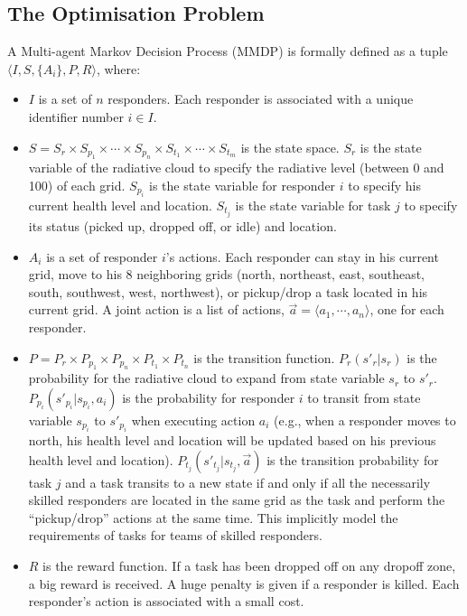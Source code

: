 \subsection{The Optimisation Problem}
A Multi-agent Markov Decision Process (MMDP) is formally defined as
a tuple $\langle I, S, \{A_i\}, P, R \rangle$, where:
\begin{itemize}
  \item $I$ is a set of $n$ responders. Each responder is
      associated with a unique identifier number $i\in I$.
  \item $S = S_r \times S_{p_1} \times \cdots \times S_{p_n}
      \times S_{t_1} \times \cdots \times S_{t_m}$ is the state
      space. $S_r$ is the state variable of the radiative cloud
      to specify the radiative level (between 0 and 100) of
      each grid. $S_{p_i}$ is the state variable for responder
      $i$ to specify his current health level and location.
      $S_{t_j}$ is the state variable for task $j$ to specify
      its status (picked up, dropped off, or idle) and
      location.
  \item $A_i$ is a set of responder $i$'s actions. Each
      responder can stay in his current grid, move to his 8
      neighboring grids (north, northeast, east, southeast,
      south, southwest, west, northwest), or pickup/drop a task
      located in his current grid. A joint action is a list of
      actions, $\vec{a}=\langle a_1, \cdots, a_n \rangle$, one
      for each responder.
  \item $P = P_r \times P_{p_1} \times P_{p_n} \times P_{t_1}
      \times P_{t_n}$ is the transition function.
      $P_r(s'_r|s_r)$ is the probability for the radiative
      cloud to expand from state variable $s_r$ to $s'_r$.
      $P_{p_i}(s'_{p_i}|s_{p_i}, a_i)$ is the probability for
      responder $i$ to transit from state variable $s_{p_i}$ to
      $s'_{p_i}$ when executing action $a_i$ (e.g., when a
      responder moves to north, his health level and location
      will be updated based on his previous health level and
      location). $P_{t_j}(s'_{t_j}|s_{t_j}, \vec{a})$ is the
      transition probability for task $j$ and a task transits
      to a new state if and only if all the necessarily skilled
      responders are located in the same grid as the task and
      perform the ``pickup/drop'' actions at the same time.
      This implicitly model the requirements of tasks for teams
      of skilled responders.
  \item $R$ is the reward function. If a task has been dropped
      off on any dropoff zone, a big reward is received. A huge
      penalty is given if a responder is killed. Each
      responder's action is associated with a small cost.
\end{itemize}
